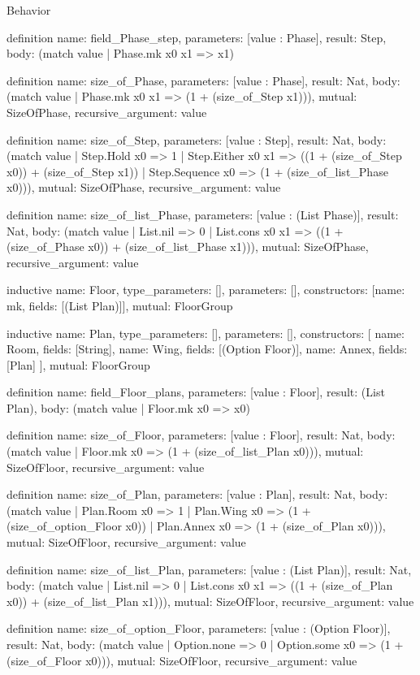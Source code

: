 \begin{lexlean}{Behavior}
\begin{semanticmodule}
definition{
  name: field_Phase_step,
  parameters: [value : Phase],
  result: Step,
  body: (match value | Phase.mk x0 x1 => x1)
}

definition{
  name: size_of_Phase,
  parameters: [value : Phase],
  result: Nat,
  body: (match value | Phase.mk x0 x1 => (1 + (size_of_Step x1))),
  mutual: SizeOfPhase,
  recursive_argument: value
}

definition{
  name: size_of_Step,
  parameters: [value : Step],
  result: Nat,
  body: (match value
    | Step.Hold x0 => 1
    | Step.Either x0 x1 => ((1 + (size_of_Step x0)) + (size_of_Step x1))
    | Step.Sequence x0 => (1 + (size_of_list_Phase x0))),
  mutual: SizeOfPhase,
  recursive_argument: value
}

definition{
  name: size_of_list_Phase,
  parameters: [value : (List Phase)],
  result: Nat,
  body: (match value
    | List.nil => 0
    | List.cons x0 x1 => ((1 + (size_of_Phase x0)) + (size_of_list_Phase x1))),
  mutual: SizeOfPhase,
  recursive_argument: value
}

inductive{
  name: Floor,
  type_parameters: [],
  parameters: [],
  constructors: [{name: mk, fields: [(List Plan)]}],
  mutual: FloorGroup
}

inductive{
  name: Plan,
  type_parameters: [],
  parameters: [],
  constructors: [
    {name: Room, fields: [String]},
    {name: Wing, fields: [(Option Floor)]},
    {name: Annex, fields: [Plan]}
  ],
  mutual: FloorGroup
}

definition{
  name: field_Floor_plans,
  parameters: [value : Floor],
  result: (List Plan),
  body: (match value | Floor.mk x0 => x0)
}

definition{
  name: size_of_Floor,
  parameters: [value : Floor],
  result: Nat,
  body: (match value | Floor.mk x0 => (1 + (size_of_list_Plan x0))),
  mutual: SizeOfFloor,
  recursive_argument: value
}

definition{
  name: size_of_Plan,
  parameters: [value : Plan],
  result: Nat,
  body: (match value
    | Plan.Room x0 => 1
    | Plan.Wing x0 => (1 + (size_of_option_Floor x0))
    | Plan.Annex x0 => (1 + (size_of_Plan x0))),
  mutual: SizeOfFloor,
  recursive_argument: value
}

definition{
  name: size_of_list_Plan,
  parameters: [value : (List Plan)],
  result: Nat,
  body: (match value
    | List.nil => 0
    | List.cons x0 x1 => ((1 + (size_of_Plan x0)) + (size_of_list_Plan x1))),
  mutual: SizeOfFloor,
  recursive_argument: value
}

definition{
  name: size_of_option_Floor,
  parameters: [value : (Option Floor)],
  result: Nat,
  body: (match value | Option.none => 0 | Option.some x0 => (1 + (size_of_Floor x0))),
  mutual: SizeOfFloor,
  recursive_argument: value
}


\end{semanticmodule}
\end{lexlean}
